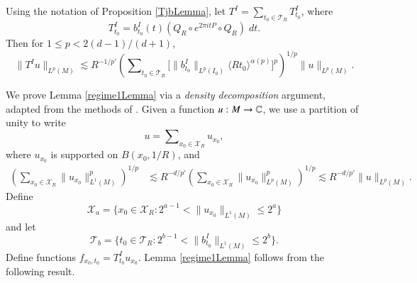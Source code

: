 \begin{lemma} \label{regime1Lemma}
    Using the notation of Proposition \ref{TjbLemma}, let $T^I = \sum\nolimits_{t_0 \in \mathcal{T}_R} T^I_{t_0}$, where
    \begin{equation}
        T^I_{t_0} = b_{t_0}^I(t) (Q_R \circ e^{2 \pi i t P} \circ Q_R)\; dt.
    \end{equation}
    Then for $1 \leq p < 2 (d-1) / (d+1)$,
    \begin{equation}
        \| T^I u \|_{L^p(M)} \lesssim R^{-1/p'} \left( \sum\nolimits_{t_0 \in \mathcal{T}_R} \Big[ \| b^I_{t_0} \|_{L^p(I_0)} \langle R t_0 \rangle^{\alpha(p)} \Big]^p \right)^{1/p} \| u \|_{L^p(M)}.
    \end{equation}
\end{lemma}

We prove Lemma \ref{regime1Lemma} via a \emph{density decomposition} argument, adapted from the methods of \cite{HeoandNazarovandSeeger}. Given a function $u: M \to \operatorname{\mathbb{C}}$, we use a partition of unity to write
%
\begin{equation}
    u = \sum\nolimits_{x_0 \in \mathcal{X}_R} u_{x_0},
\end{equation}
%
where $u_{x_0}$ is supported on $B(x_0,1/R)$, and
%
\begin{equation}
\begin{split}
    \left( \sum\nolimits_{x_0 \in \mathcal{X}_R} \| u_{x_0} \|_{L^1(M)}^p \right)^{1/p} &\lesssim R^{-d/p'} \left( \sum\nolimits_{x_0 \in \mathcal{X}_R} \| u_{x_0} \|_{L^p(M)}^p \right)^{1/p} \lesssim R^{-d/p'} \| u \|_{L^p(M)}.
\end{split}
\end{equation}
Define
%
\begin{equation}
    \mathcal{X}_{a} = \{ x_0 \in \mathcal{X}_R: 2^{a-1} < \| u_{x_0} \|_{L^1(M)} \leq 2^a \}
\end{equation}
%
and let
%
\begin{equation}
    \mathcal{T}_{b} = \{ t_0 \in \mathcal{T}_R: 2^{b-1} < \| b_{t_0}^I \|_{L^1(M)} \leq 2^b \}.
\end{equation}
%
Define functions $f_{x_0,t_0} = T_{t_0}^I u_{x_0}$. Lemma \ref{regime1Lemma} follows from the following result.

